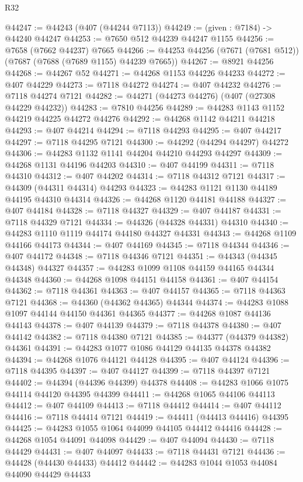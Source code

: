 \begin{lexlean}{R32}
\begin{coremodule}
@44247 := @44243 (@407 (@44244 @7113))
@44249 := (given : @7184) -> @44240 @44247
@44253 := @7650 @512 @44239 @44247 @1155
@44256 := @7658 (@7662 @44237) @7665
@44266 := @44253 @44256 (@7671 (@7681 @512)) (@7687 (@7688 (@7689 @1155) @44239 @7665))
@44267 := @8921 @44256
@44268 := @44267 @52
@44271 := @44268 @1153 @44226 @44233
@44272 := @407 @44229
@44273 := @7118 @44272
@44274 := @407 @44232
@44276 := @7118 @44274 @7121
@44282 := @44271 (@44273 @44276) (@407 (@27308 @44229 @44232))
@44283 := @7810 @44256
@44289 := @44283 @1143 @1152 @44219 @44225 @44272 @44276
@44292 := @44268 @1142 @44211 @44218
@44293 := @407 @44214
@44294 := @7118 @44293
@44295 := @407 @44217
@44297 := @7118 @44295 @7121
@44300 := @44292 (@44294 @44297) @44272
@44306 := @44283 @1132 @1141 @44204 @44210 @44293 @44297
@44309 := @44268 @1131 @44196 @44203
@44310 := @407 @44199
@44311 := @7118 @44310
@44312 := @407 @44202
@44314 := @7118 @44312 @7121
@44317 := @44309 (@44311 @44314) @44293
@44323 := @44283 @1121 @1130 @44189 @44195 @44310 @44314
@44326 := @44268 @1120 @44181 @44188
@44327 := @407 @44184
@44328 := @7118 @44327
@44329 := @407 @44187
@44331 := @7118 @44329 @7121
@44334 := @44326 (@44328 @44331) @44310
@44340 := @44283 @1110 @1119 @44174 @44180 @44327 @44331
@44343 := @44268 @1109 @44166 @44173
@44344 := @407 @44169
@44345 := @7118 @44344
@44346 := @407 @44172
@44348 := @7118 @44346 @7121
@44351 := @44343 (@44345 @44348) @44327
@44357 := @44283 @1099 @1108 @44159 @44165 @44344 @44348
@44360 := @44268 @1098 @44151 @44158
@44361 := @407 @44154
@44362 := @7118 @44361
@44363 := @407 @44157
@44365 := @7118 @44363 @7121
@44368 := @44360 (@44362 @44365) @44344
@44374 := @44283 @1088 @1097 @44144 @44150 @44361 @44365
@44377 := @44268 @1087 @44136 @44143
@44378 := @407 @44139
@44379 := @7118 @44378
@44380 := @407 @44142
@44382 := @7118 @44380 @7121
@44385 := @44377 (@44379 @44382) @44361
@44391 := @44283 @1077 @1086 @44129 @44135 @44378 @44382
@44394 := @44268 @1076 @44121 @44128
@44395 := @407 @44124
@44396 := @7118 @44395
@44397 := @407 @44127
@44399 := @7118 @44397 @7121
@44402 := @44394 (@44396 @44399) @44378
@44408 := @44283 @1066 @1075 @44114 @44120 @44395 @44399
@44411 := @44268 @1065 @44106 @44113
@44412 := @407 @44109
@44413 := @7118 @44412
@44414 := @407 @44112
@44416 := @7118 @44414 @7121
@44419 := @44411 (@44413 @44416) @44395
@44425 := @44283 @1055 @1064 @44099 @44105 @44412 @44416
@44428 := @44268 @1054 @44091 @44098
@44429 := @407 @44094
@44430 := @7118 @44429
@44431 := @407 @44097
@44433 := @7118 @44431 @7121
@44436 := @44428 (@44430 @44433) @44412
@44442 := @44283 @1044 @1053 @44084 @44090 @44429 @44433

\end{coremodule}
\end{lexlean}

